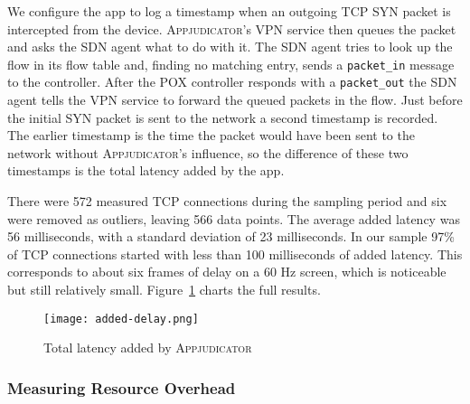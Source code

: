 We configure the app to log a timestamp when an outgoing TCP SYN packet is
intercepted from the device. \textsc{Appjudicator}'s VPN service then queues the
packet and asks the SDN agent what to do with it. The SDN agent tries to look up
the flow in its flow table and, finding no matching entry, sends a
\texttt{packet\_in} message to the controller. After the POX controller responds
with a \texttt{packet\_out} the SDN agent tells the VPN service to forward the
queued packets in the flow. Just before the initial SYN packet is sent to the
network a second timestamp is recorded. The earlier timestamp is the time the
packet would have been sent to the network without \textsc{Appjudicator}'s
influence, so the difference of these two timestamps is the total latency added
by the app.

There were 572 measured TCP connections during the sampling period and six were
removed as outliers, leaving 566 data points. The average added latency was 56
milliseconds, with a standard deviation of 23 milliseconds. In our sample 97\%
of TCP connections started with less than 100 milliseconds of added latency.
This corresponds to about six frames of delay on a 60 Hz screen, which is
noticeable but still relatively small. Figure~\ref{fig:tcp-delay-chart} charts
the full results.

\begin{figure}[h]
    \centering
	\texttt{[image: added-delay.png]}
	\caption{Total latency added by \textsc{Appjudicator}}
	\label{fig:tcp-delay-chart}
\end{figure}

\subsubsection{Measuring Resource Overhead}
\label{sec:measuring-resource-overhead}


\newpage
